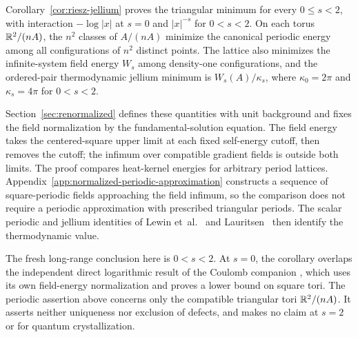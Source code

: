 Corollary~\ref{cor:riesz-jellium} proves the triangular minimum for every
$0\le s<2$, with interaction $-\log|x|$ at $s=0$ and $|x|^{-s}$ for
$0<s<2$. On each torus $\mathbb R^2/(nA)$, the $n^2$ classes of $A/(nA)$
minimize the canonical periodic energy among all configurations of $n^2$
distinct points. The lattice also minimizes the infinite-system field
energy $W_s$ among density-one configurations, and the ordered-pair
thermodynamic jellium minimum is
$W_s(A)/\kappa_s$, where $\kappa_0=2\pi$ and $\kappa_s=4\pi$ for
$0<s<2$.

Section~\ref{sec:renormalized} defines these quantities with unit background
and fixes the field normalization by the fundamental-solution equation.
The field energy takes the centered-square upper limit at each fixed
self-energy cutoff, then removes the cutoff; the infimum over compatible
gradient fields is outside both limits. The proof compares heat-kernel
energies for arbitrary period lattices. Appendix~\ref{app:normalized-periodic-approximation}
constructs a sequence of square-periodic fields approaching the field
infimum, so the comparison does not require a periodic approximation with
prescribed triangular periods. The scalar periodic and jellium identities
of Lewin et~al.~\citep[Section~VI, Theorem~2]{LewinLiebSeiringer2019} and
Lauritsen~\citep[Theorem~II.1]{Lauritsen2021} then identify the thermodynamic value.

The fresh long-range conclusion here is $0<s<2$.  At $s=0$, the corollary
overlaps the independent direct logarithmic result of the Coulomb companion
\citep[Theorems~1.1--1.2]{CoulombRenormalized2026}, which uses its own field-energy
normalization and proves a lower bound on square tori.  The periodic assertion
above concerns only the compatible triangular tori $\mathbb R^2/(nA)$.  It asserts
neither uniqueness nor exclusion of defects, and makes no claim at $s=2$ or
for quantum crystallization.
